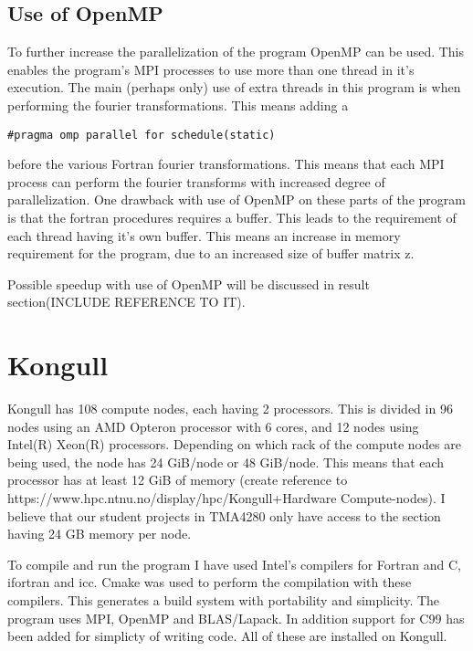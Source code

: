 \subsection{Use of OpenMP}
To further increase the parallelization of the program OpenMP can be used. This enables the program's MPI processes to use more than one thread in it's execution. 
The main (perhaps only) use of extra threads in this program is when performing the fourier transformations. This means adding a 
\begin{lstlisting}
#pragma omp parallel for schedule(static)
\end{lstlisting}
before the various Fortran fourier transformations. This means that each MPI process can perform the fourier transforms with increased degree of parallelization. One drawback with use of OpenMP on these parts of the program is that the fortran procedures requires a buffer. This leads to the requirement of each thread having it's own buffer. This means an increase in memory requirement for the program, due to an increased size of buffer matrix z.

Possible speedup with use of OpenMP will be discussed in result section(INCLUDE REFERENCE TO IT). 



\section{Kongull}
Kongull has 108 compute nodes, each having 2 processors. This is divided in 96 nodes using an AMD Opteron processor with 6 cores, and 12 nodes using Intel(R) Xeon(R) processors. Depending on which rack of the compute nodes are being used, the node has 24 GiB/node or 48 GiB/node. This means that each processor has at least 12 GiB of memory (create reference to https://www.hpc.ntnu.no/display/hpc/Kongull+Hardware Compute-nodes). I believe that our student projects in TMA4280 only have access to the section having 24 GB memory per node. 

To compile and run the program I have used Intel's compilers for Fortran and C, ifortran and icc. Cmake was used to perform the compilation with these compilers. This generates a build system with portability and simplicity. 
The program uses MPI, OpenMP and BLAS/Lapack. In addition support for C99 has been added for simplicty of writing code.
All of these are installed on Kongull.


